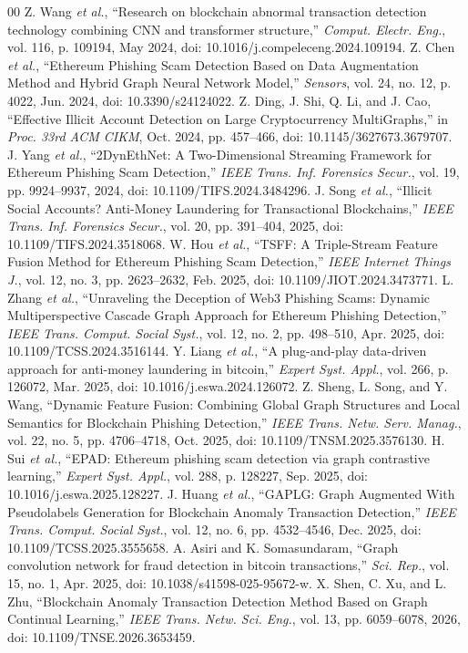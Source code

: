 \documentclass{ieeeaccess}
\begin{document}
\begin{thebibliography}{00}
 Z. Wang \emph{et al.}, ``Research on blockchain abnormal transaction detection technology combining CNN and transformer structure,'' \emph{Comput. Electr. Eng.}, vol. 116, p. 109194, May 2024, doi: 10.1016/j.compeleceng.2024.109194.
 Z. Chen \emph{et al.}, ``Ethereum Phishing Scam Detection Based on Data Augmentation Method and Hybrid Graph Neural Network Model,'' \emph{Sensors}, vol. 24, no. 12, p. 4022, Jun. 2024, doi: 10.3390/s24124022.
 Z. Ding, J. Shi, Q. Li, and J. Cao, ``Effective Illicit Account Detection on Large Cryptocurrency MultiGraphs,'' in \emph{Proc. 33rd ACM CIKM}, Oct. 2024, pp. 457--466, doi: 10.1145/3627673.3679707.
 J. Yang \emph{et al.}, ``2DynEthNet: A Two-Dimensional Streaming Framework for Ethereum Phishing Scam Detection,'' \emph{IEEE Trans. Inf. Forensics Secur.}, vol. 19, pp. 9924--9937, 2024, doi: 10.1109/TIFS.2024.3484296.
 J. Song \emph{et al.}, ``Illicit Social Accounts? Anti-Money Laundering for Transactional Blockchains,'' \emph{IEEE Trans. Inf. Forensics Secur.}, vol. 20, pp. 391--404, 2025, doi: 10.1109/TIFS.2024.3518068.
 W. Hou \emph{et al.}, ``TSFF: A Triple-Stream Feature Fusion Method for Ethereum Phishing Scam Detection,'' \emph{IEEE Internet Things J.}, vol. 12, no. 3, pp. 2623--2632, Feb. 2025, doi: 10.1109/JIOT.2024.3473771.
 L. Zhang \emph{et al.}, ``Unraveling the Deception of Web3 Phishing Scams: Dynamic Multiperspective Cascade Graph Approach for Ethereum Phishing Detection,'' \emph{IEEE Trans. Comput. Social Syst.}, vol. 12, no. 2, pp. 498--510, Apr. 2025, doi: 10.1109/TCSS.2024.3516144.
 Y. Liang \emph{et al.}, ``A plug-and-play data-driven approach for anti-money laundering in bitcoin,'' \emph{Expert Syst. Appl.}, vol. 266, p. 126072, Mar. 2025, doi: 10.1016/j.eswa.2024.126072.
 Z. Sheng, L. Song, and Y. Wang, ``Dynamic Feature Fusion: Combining Global Graph Structures and Local Semantics for Blockchain Phishing Detection,'' \emph{IEEE Trans. Netw. Serv. Manag.}, vol. 22, no. 5, pp. 4706--4718, Oct. 2025, doi: 10.1109/TNSM.2025.3576130.
 H. Sui \emph{et al.}, ``EPAD: Ethereum phishing scam detection via graph contrastive learning,'' \emph{Expert Syst. Appl.}, vol. 288, p. 128227, Sep. 2025, doi: 10.1016/j.eswa.2025.128227.
 J. Huang \emph{et al.}, ``GAPLG: Graph Augmented With Pseudolabels Generation for Blockchain Anomaly Transaction Detection,'' \emph{IEEE Trans. Comput. Social Syst.}, vol. 12, no. 6, pp. 4532--4546, Dec. 2025, doi: 10.1109/TCSS.2025.3555658.
 A. Asiri and K. Somasundaram, ``Graph convolution network for fraud detection in bitcoin transactions,'' \emph{Sci. Rep.}, vol. 15, no. 1, Apr. 2025, doi: 10.1038/s41598-025-95672-w.
 X. Shen, C. Xu, and L. Zhu, ``Blockchain Anomaly Transaction Detection Method Based on Graph Continual Learning,'' \emph{IEEE Trans. Netw. Sci. Eng.}, vol. 13, pp. 6059--6078, 2026, doi: 10.1109/TNSE.2026.3653459.
\end{thebibliography}
\end{document}
